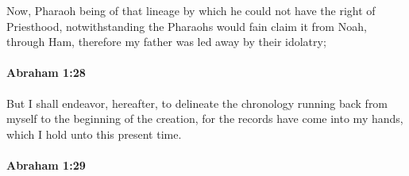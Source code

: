 			Now, Pharaoh being of that lineage by which he could not have the right of Priesthood, notwithstanding the Pharaohs would fain claim it from Noah, through Ham, therefore my father was led away by their idolatry;


		\paragraph{Abraham 1:28} %
			\label{ABRAHAM-1-28}

			But I shall endeavor, hereafter, to delineate the chronology running back from myself to the beginning of the creation, for the records have come into my hands, which I hold unto this present time.


		\paragraph{Abraham 1:29} %
			\label{ABRAHAM-1-29}

